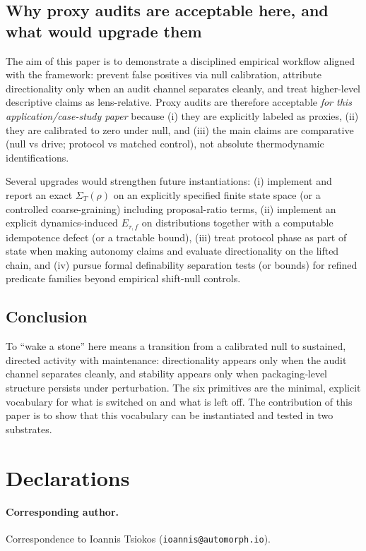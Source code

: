 \documentclass[11pt]{article}
\newcommand{\Sig}{\Sigma}
\begin{document}
\subsection{Why proxy audits are acceptable here, and what would upgrade them}\label{sec:discussion:upgrades}
The aim of this paper is to demonstrate a disciplined empirical workflow aligned with the framework: prevent false positives via null calibration, attribute directionality only when an audit channel separates cleanly, and treat higher-level descriptive claims as lens-relative. Proxy audits are therefore acceptable \emph{for this application/case-study paper} because (i) they are explicitly labeled as proxies, (ii) they are calibrated to zero under null, and (iii) the main claims are comparative (null vs drive; protocol vs matched control), not absolute thermodynamic identifications.

Several upgrades would strengthen future instantiations:
(i) implement and report an exact $\Sig_T(\rho)$ on an explicitly specified finite state space (or a controlled coarse-graining) including proposal-ratio terms,
(ii) implement an explicit dynamics-induced $E_{\tau,f}$ on distributions together with a computable idempotence defect (or a tractable bound),
(iii) treat protocol phase as part of state when making autonomy claims and evaluate directionality on the lifted chain, and
(iv) pursue formal definability separation tests (or bounds) for refined predicate families beyond empirical shift-null controls.

\subsection{Conclusion}\label{sec:discussion:closing}
To ``wake a stone'' here means a transition from a calibrated null to sustained, directed activity with maintenance: directionality appears only when the audit channel separates cleanly, and stability appears only when packaging‑level structure persists under perturbation. The six primitives are the minimal, explicit vocabulary for what is switched on and what is left off. The contribution of this paper is to show that this vocabulary can be instantiated and tested in two substrates.

\section*{Declarations}

\paragraph{Corresponding author.}
Correspondence to Ioannis Tsiokos (\texttt{ioannis@automorph.io}).
\end{document}
